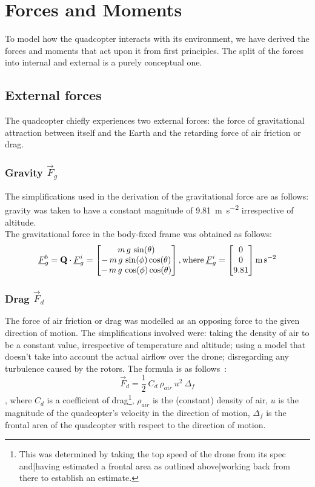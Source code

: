 
\section{Forces and Moments}
To model how the quadcopter interacts with its environment, we have derived the forces and moments that act upon it from first principles. The split of the forces into internal and external is a purely conceptual one.
\subsection{External forces}
The quadcopter chiefly experiences two external forces: the force of gravitational attraction between itself and the Earth and the retarding force of air friction or drag.
\subsubsection{Gravity $\vec{F}_g$}
The simplifications used in the derivation of the gravitational force are as follows: gravity was taken to have a constant magnitude of  \SI{9.81}{\metre\per\second\squared} irrespective of altitude.
\\
The gravitational force in the body-fixed frame was obtained as follows:
$$
\underline{F}_g^b = \textbf{Q}\cdot\underline{F}_g^i = \begin{bmatrix}
m\,g\,\sin(\theta)\\-\,m\,g\,\sin(\phi)\cos(\theta)\\-\,m\,g\,\cos(\phi)\cos(\theta)
\end{bmatrix}
\mathrm{, where }\:
\underline{F}_g^i = \begin{bmatrix}
0\\0\\9.81
\end{bmatrix}
\si{\metre\per\second\squared}
$$
\subsubsection{Drag $\vec{F}_d$}
The force of air friction or drag was modelled as an opposing force to the given direction of motion. The simplifications involved were: taking the density of air to be a constant value, irrespective of temperature and altitude; using a model that doesn't take into account the actual airflow over the drone; disregarding any turbulence caused by the rotors. The formula is as follows~:
\begin{equation}
\label{eqn:drag}
\vec{F}_d = \frac{1}{2}\:C_d\:\rho_{air}\:u^2\:\Delta_f
\end{equation}
, where $C_d$ is a coefficient of drag\footnote{This was determined by taking the top speed of the drone from its spec \cite{drone-spec} and|having estimated a frontal area as outlined above|working back from there to establish an estimate. }, $\rho_{air}$ is the (constant) density of air, $u$ is the magnitude of the quadcopter's velocity in the direction of motion, $\Delta_f$ is the frontal area of the quadcopter with respect to the direction of motion.

